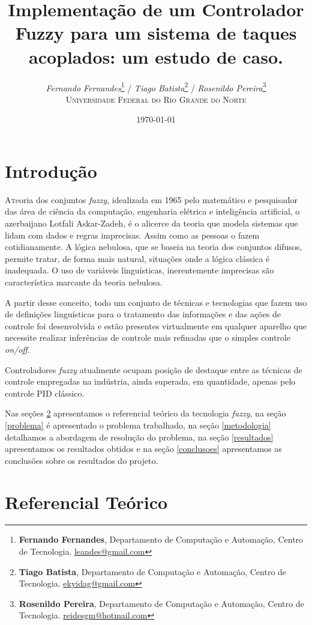 \documentclass[
	twoside,				%
	twocolumn,				%
	english,				%
	brazil,					%
]{article}
\title{Implementação de um Controlador Fuzzy para um sistema de taques acoplados: um estudo de caso.}
\author{
\textit{Fernando Fernandes}\thanks{\textbf{Fernando Fernandes}, Departamento de Computação e Automação, Centro de Tecnologia. \href{mailto:leandes@gmail.com}{leandes@gmail.com}} / 
\textit{Tiago Batista}\thanks{\textbf{Tiago Batista}, Departamento de Computação e Automação, Centro de Tecnologia. \href{mailto:ekyidag@gmail.com}{ekyidag@gmail.com}} / 
\textit{Rosenildo Pereira}\thanks{\textbf{Rosenildo Pereira}, Departamento de Computação e Automação, Centro de Tecnologia. \href{mailto:reidesgm@hotmail.com}{reidesgm@hotmail.com}} \\ [1ex]
\textsc{Universidade Federal do Rio Grande do Norte} \\
}
\date{\today} %
\begin{document}
\maketitle


\section{Introdução}

\lettrine[nindent=0em,lines=3]{A} teoria dos conjuntos \textit{fuzzy}, idealizada em 1965 pelo matemático e pesquisador das área de ciência da computação, engenharia elétrica e inteligência artificial, o azerbaijano Lotfali Askar-Zadeh, é o alicerce da teoria que modela sistemas que lidam com dados e regras imprecisas. Assim como as pessoas o fazem cotidianamente. A lógica nebulosa, que se baseia na teoria dos conjuntos difusos, permite tratar, de forma mais natural, situações onde a lógica clássica é inadequada. O uso de variáveis  linguísticas, inerentemente imprecisas são característica marcante da teoria nebulosa.

A partir desse conceito, todo um conjunto de técnicas e tecnologias que fazem uso de definições linguísticas para o tratamento das informações e das ações de controle foi desenvolvida e estão presentes virtualmente em qualquer aparelho que necessite realizar inferências de controle mais refinadas que o simples controle \textit{on/off}.

Controladores \textit{fuzzy} atualmente ocupam posição de destaque entre as técnicas de controle empregadas na indústria, ainda superada, em quantidade, apenas pelo controle PID clássico.

Nas seções \ref{referencialTeorico} apresentamos o referencial teórico da tecnologia \textit{fuzzy}, na seção \ref{problema} é apresentado o problema trabalhado, na seção \ref{metodologia} detalhamos a abordagem de resolução do problema, na seção \ref{resultados} apresentamos os resultados obtidos e na seção \ref{conclusoes} apresentamos as conclusões sobre os resultados do projeto.

\section{Referencial Teórico}\label{referencialTeorico}
\end{document}
